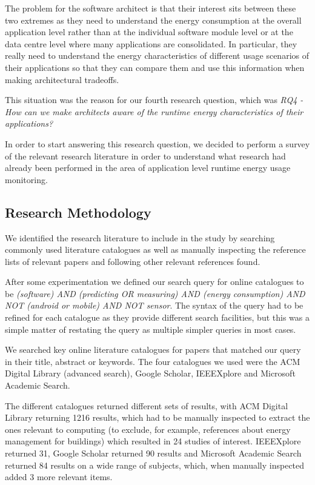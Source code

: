 The problem for the software architect is that their interest sits between these two extremes as they need to understand the energy consumption at the overall application level rather than at the individual software module level or at the data centre level where many applications are consolidated.  In particular, they really need to understand the energy characteristics of different usage scenarios of their applications so that they can compare them and use this information when making architectural tradeoffs.

This situation was the reason for our fourth research question, which was \emph{
RQ4 - How can we make architects aware of the runtime energy characteristics of their applications?}

In order to start answering this research question, we decided to perform a survey of the relevant research literature in order to understand what research had already been performed in the area of application level runtime energy usage monitoring.

\subsection{Research Methodology}

We identified the research literature to include in the study by searching commonly used literature catalogues as well as manually inspecting the reference lists of relevant papers and following other relevant references found.

After some experimentation we defined our search query for online catalogues to be \emph{(software) AND (predicting OR measuring) AND (energy consumption) AND NOT (android or mobile) AND NOT sensor}.  The syntax of the query had to be refined for each catalogue as they provide different search facilities, but this was a simple matter of restating the query as multiple simpler queries in most cases.

We searched key online literature catalogues for papers that matched our query in their title, abstract or keywords.  The four catalogues we used were the ACM Digital Library (advanced search), Google Scholar, IEEEXplore and Microsoft Academic Search.

The different catalogues returned different sets of results, with ACM Digital Library returning 1216 results, which had to be manually inspected to extract the ones relevant to computing (to exclude, for example, references about energy management for buildings) which resulted in 24 studies of interest.  IEEEXplore returned 31, Google Scholar returned 90 results and Microsoft Academic Search returned 84 results on a wide range of subjects, which, when manually inspected added 3 more relevant items.

